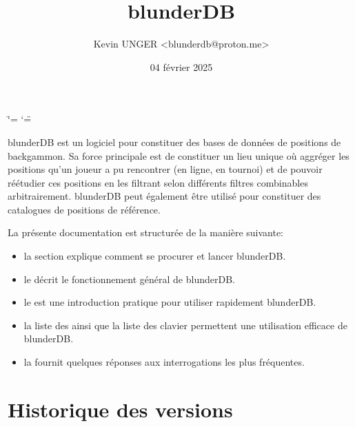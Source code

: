 \documentclass[letterpaper,10pt,french]{sphinxmanual}
\title{blunderDB}
\date{04 février 2025}
\author{Kevin UNGER \textless{}blunderdb@proton.me\textgreater{}}
\begin{document}
\ifdefined\shorthandoff
  \ifnum\catcode`\=\string=\active\shorthandoff{=}\fi
  \ifnum\catcode`\"=\active{}\fi
\fi

\pagestyle{empty}
\sphinxmaketitle
\pagestyle{plain}
\sphinxtableofcontents
\pagestyle{normal}
\label{\detokenize{index::doc}}


\sphinxAtStartPar
blunderDB est un logiciel pour constituer des bases de données de positions de
backgammon. Sa force principale est de constituer un lieu unique où aggréger
les positions qu’un joueur a pu rencontrer (en ligne, en tournoi) et de pouvoir
réétudier ces positions en les filtrant selon différents filtres combinables
arbitrairement. blunderDB peut également être utilisé pour constituer des
catalogues de positions de référence.

\sphinxAtStartPar
La présente documentation est structurée de la manière suivante:
\begin{itemize}
\item {} 
\sphinxAtStartPar
la section  explique comment se procurer et
lancer blunderDB.

\item {} 
\sphinxAtStartPar
le  décrit le fonctionnement général de blunderDB.

\item {} 
\sphinxAtStartPar
le  est une introduction pratique pour utiliser
rapidement blunderDB.

\item {} 
\sphinxAtStartPar
la liste des  ainsi que la liste des 
clavier permettent une utilisation efficace de blunderDB.

\item {} 
\sphinxAtStartPar
la  fournit quelques réponses aux interrogations les plus fréquentes.

\end{itemize}


\chapter{Historique des versions}
\label{\detokenize{index:historique-des-versions}}
\end{document}
